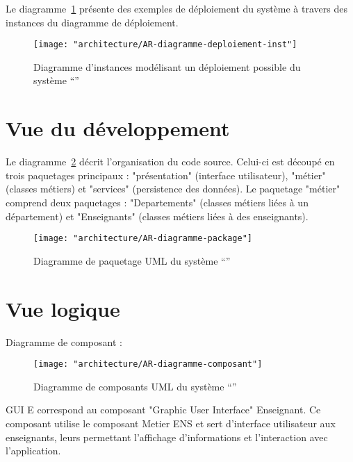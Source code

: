     Le diagramme~\ref{dgm-deploiement-instance} présente des exemples de déploiement du système à travers des instances du diagramme de déploiement.
    
    \begin{figure}[h]
    \begin{center}
    \texttt{[image: "architecture/AR-diagramme-deploiement-inst"]}
    \caption{Diagramme d'instances modélisant un déploiement possible du système ``\projet{}''}
    \label{dgm-deploiement-instance}
    \end{center}
    \end{figure} 

\section{Vue du développement} 

    Le diagramme~\ref{dgm-package} décrit l'organisation du code source. Celui-ci est découpé en trois paquetages principaux : "présentation" (interface utilisateur), "métier" (classes métiers) et "services" (persistence des données). Le paquetage "métier" comprend deux paquetages : "Departements" (classes métiers liées à un département) et "Enseignants" (classes métiers liées à des enseignants).
    
    \begin{figure}[h]
    \begin{center}
    \texttt{[image: "architecture/AR-diagramme-package"]}
    \caption{Diagramme de paquetage UML du système ``\projet{}''}
    \label{dgm-package}
    \end{center}
    \end{figure} 
    \newpage
    
\section{Vue logique} 

    Diagramme de composant :
    
    
    \begin{figure}[h!]
    \begin{center}
    \texttt{[image: "architecture/AR-diagramme-composant"]}
    \caption{Diagramme de composants UML du système ``\projet{}''}
    \label{dgm-composant}
    \end{center}
    \end{figure} 


    GUI E correspond au composant "Graphic User Interface" Enseignant. 
    Ce composant utilise le composant Metier ENS et sert d'interface utilisateur aux enseignants, leurs permettant l'affichage d'informations et l'interaction avec l'application.\\
    
